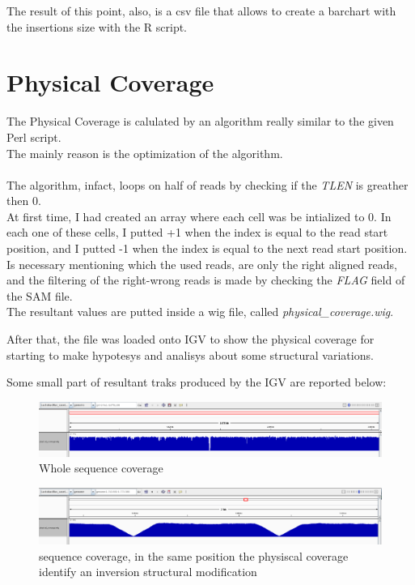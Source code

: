 The result of this point, also, is a csv file that allows to create a barchart with the insertions size with the R script.

\section{Physical Coverage}

The Physical Coverage is calulated by an algorithm really similar to the given Perl script.\\

The mainly reason is the optimization of the algorithm.\\\\

The algorithm, infact, loops on half of reads by checking if the \emph{TLEN} is greather then 0.\\
At first time, I had created an array where each cell was be intialized to 0. 
In each one of these cells, I putted +1 when the index is equal to the read start position, and I putted -1 when the index is equal to the next read start position.\\

Is necessary mentioning which the used reads, are only the right aligned reads, and the filtering of the right-wrong reads is made by checking the \emph{FLAG} field of the SAM file.
\\
The resultant values are putted inside a wig file, called \emph{physical\_coverage.wig}.

After that, the file was loaded onto IGV to show the physical coverage for starting to make hypotesys and analisys about some structural variations.

Some small part of resultant traks produced by the IGV are reported below:

 \begin{figure}[H]
				\centering
				\includegraphics[scale=0.6]{immagini/physical_coverage_1.png}
				\caption{Whole sequence coverage}\label{fig:6}
				\end{figure}


 \begin{figure}[H]
				\centering
				\includegraphics[scale=0.6]{immagini/physical_coverage_2.png}
				\caption{sequence coverage, in the same position the physiscal coverage identify an inversion structural modification}\label{fig:7}
				\end{figure}
				
